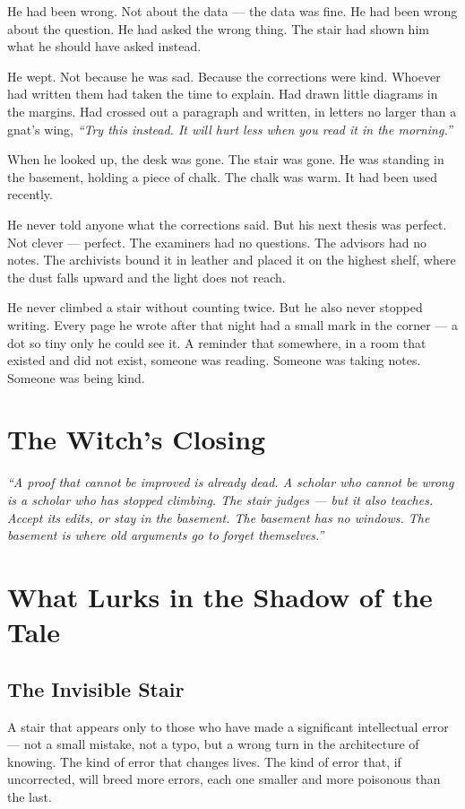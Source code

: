 He had been wrong. Not about the data — the data was fine. He had been wrong about the question. He had asked the wrong thing. The stair had shown him what he should have asked instead.

He wept. Not because he was sad. Because the corrections were kind. Whoever had written them had taken the time to explain. Had drawn little diagrams in the margins. Had crossed out a paragraph and written, in letters no larger than a gnat's wing, \textit{``Try this instead. It will hurt less when you read it in the morning.''}

When he looked up, the desk was gone. The stair was gone. He was standing in the basement, holding a piece of chalk. The chalk was warm. It had been used recently.

He never told anyone what the corrections said. But his next thesis was perfect. Not clever — perfect. The examiners had no questions. The advisors had no notes. The archivists bound it in leather and placed it on the highest shelf, where the dust falls upward and the light does not reach.

He never climbed a stair without counting twice. But he also never stopped writing. Every page he wrote after that night had a small mark in the corner — a dot so tiny only he could see it. A reminder that somewhere, in a room that existed and did not exist, someone was reading. Someone was taking notes. Someone was being kind.

\section*{The Witch's Closing}

\textit{``A proof that cannot be improved is already dead. A scholar who cannot be wrong is a scholar who has stopped climbing. The stair judges — but it also teaches. Accept its edits, or stay in the basement. The basement has no windows. The basement is where old arguments go to forget themselves.''}

\section*{What Lurks in the Shadow of the Tale}

\subsection*{The Invisible Stair}

A stair that appears only to those who have made a significant intellectual error — not a small mistake, not a typo, but a wrong turn in the architecture of knowing. The kind of error that changes lives. The kind of error that, if uncorrected, will breed more errors, each one smaller and more poisonous than the last.

